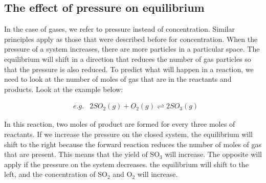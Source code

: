 {
}

\subsection{The effect of pressure on equilibrium}

In the case of gases, we refer to pressure instead of concentration. Similar principles apply as those that were described before for concentration. When the pressure of a system increases, there are more particles in a particular space. The equilibrium will shift in a direction that reduces the number of gas particles so that the pressure is also reduced. To predict what will happen in a reaction, we need to look at the number of moles of gas that are in the reactants and products. Look at the example below:

\begin{eqnarray*}
  & e.g. & 2SO_{2}(g) + O_{2}(g) \rightleftharpoons 2SO_{3}(g)
\end{eqnarray*}

In this reaction, two moles of product are formed for every three moles of reactants. If we increase the pressure on the closed system, the equilibrium will shift to the right because the forward reaction reduces the number of moles of gas that are present. This means that the yield of SO$_{3}$ will increase. The opposite will apply if the pressure on the system decreases. the equilibrium will shift to the left, and the concentration of SO$_{2}$ and O$_{2}$ will increase. 


